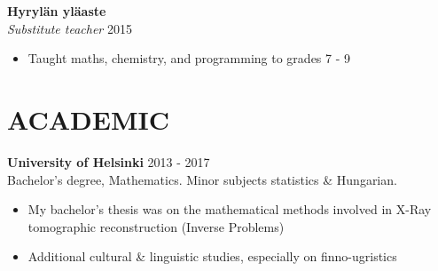 \documentclass[margin, 10pt]{res} %
\begin{document}
\begin{resume}
\addvspace{-7pt}
\textbf{Hyrylän yläaste}\\
{\sl Substitute teacher} \hfill 2015
\begin{itemize} \itemsep -2pt %
	\item Taught maths, chemistry, and programming to grades 7 - 9
\end{itemize}
\addvspace{-7pt}

\section{ACADEMIC}


\textbf{University of Helsinki} \hfill 2013 - 2017\\
Bachelor's degree, Mathematics. Minor subjects statistics \& Hungarian.
\begin{itemize} \itemsep -2pt
\item My bachelor's thesis was on the mathematical methods involved in X-Ray tomographic reconstruction (Inverse Problems)
\item Additional cultural \& linguistic studies, especially on finno-ugristics
\end{itemize}


\end{resume}
\end{document}
